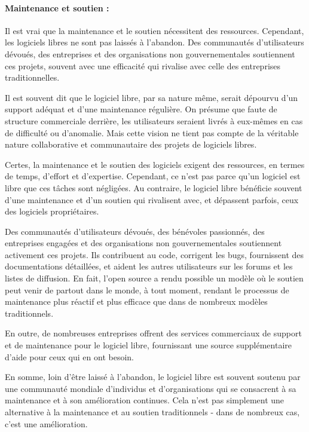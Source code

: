 \paragraph{Maintenance et soutien :} Il est vrai que la maintenance et le soutien nécessitent des ressources. Cependant, les logiciels libres ne sont pas laissés à l'abandon. Des communautés d'utilisateurs dévoués, des entreprises et des organisations non gouvernementales soutiennent ces projets, souvent avec une efficacité qui rivalise avec celle des entreprises traditionnelles.

Il est souvent dit que le logiciel libre, par sa nature même, serait dépourvu d'un support adéquat et d'une maintenance régulière. On présume que faute de structure commerciale derrière, les utilisateurs seraient livrés à eux-mêmes en cas de difficulté ou d'anomalie. Mais cette vision ne tient pas compte de la véritable nature collaborative et communautaire des projets de logiciels libres.

Certes, la maintenance et le soutien des logiciels exigent des ressources, en termes de temps, d'effort et d'expertise. Cependant, ce n'est pas parce qu'un logiciel est libre que ces tâches sont négligées. Au contraire, le logiciel libre bénéficie souvent d'une maintenance et d'un soutien qui rivalisent avec, et dépassent parfois, ceux des logiciels propriétaires.

Des communautés d'utilisateurs dévoués, des bénévoles passionnés, des entreprises engagées et des organisations non gouvernementales soutiennent activement ces projets. Ils contribuent au code, corrigent les bugs, fournissent des documentations détaillées, et aident les autres utilisateurs sur les forums et les listes de diffusion. En fait, l'open source a rendu possible un modèle où le soutien peut venir de partout dans le monde, à tout moment, rendant le processus de maintenance plus réactif et plus efficace que dans de nombreux modèles traditionnels.

En outre, de nombreuses entreprises offrent des services commerciaux de support et de maintenance pour le logiciel libre, fournissant une source supplémentaire d'aide pour ceux qui en ont besoin.

En somme, loin d'être laissé à l'abandon, le logiciel libre est souvent soutenu par une communauté mondiale d'individus et d'organisations qui se consacrent à sa maintenance et à son amélioration continues. Cela n'est pas simplement une alternative à la maintenance et au soutien traditionnels - dans de nombreux cas, c'est une amélioration.


